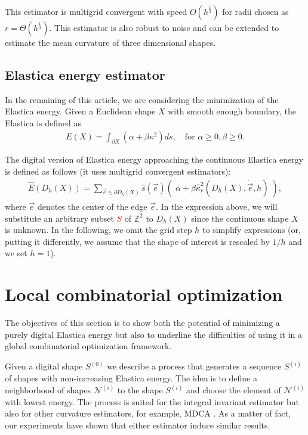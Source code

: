 \documentclass[smallextended]{svjour3}       %
\newcommand{\revision}[1]{\textcolor{red}{#1}}
\begin{document}
This estimator is multigrid convergent with speed $O(h^\frac{1}{3})$
for radii chosen as $r=\Theta(h^\frac{1}{3})$.  This estimator is also
robust to noise and can be extended to estimate the mean curvature of
three dimensional shapes.

\subsection{Elastica energy estimator}

In the remaining of this article, we are considering the minimization of the Elastica energy. Given a Euclidean shape $X$ with smooth enough boundary, the Elastica is defined as
\begin{align}
  E(X) = \int_{\partial X}{(\alpha + \beta \kappa^2) ds}, \quad \text{for~} \alpha \ge 0, \beta \ge 0.
  \label{eq:elastica}
\end{align}

The digital version of Elastica energy approaching the continuous Elastica energy is defined as follows (it uses multigrid convergent estimators):
\begin{align}
	\hat{E}( D_h(X) ) = \sum_{\vec{e} \in \partial D_h(X)}{ \hat{s}(\vec{e})\left(\; \alpha + \beta \hat{\kappa}_{r}^2(D_h(X),\dot{\vec{e}},h) \; \right)},
	\label{eq:digital-energy}
\end{align}
where $\dot{\vec{e}}$ denotes the center of the edge $\vec{e}$. In the
expression above, we will substitute an arbitrary subset \revision{$S$} of
$\mathbb{Z}^2$ to $D_h(X)$ since the continuous shape $X$ is unknown.
In the following, we omit the grid step $h$ to simplify expressions
(or, putting it differently, we assume that the shape of interest is
rescaled by $1/h$ and we set $h=1$).

\section{Local combinatorial optimization}

The objectives of this section is to show both the potential of minimizing a purely digital Elastica energy but also to underline the difficulties of using it in a global combinatorial optimization framework.

Given a digital shape $S^{(0)}$ we describe a process that generates a
sequence $S^{(i)}$ of shapes with non-increasing Elastica energy. The
idea is to define a neighborhood of shapes $\mathcal{N}^{(i)}$ to the
shape $S^{(i)}$ and choose the element of $\mathcal{N}^{(i)}$ with
lowest energy.  The process is suited for the integral invariant
estimator but also for other curvature estimators, for example, MDCA
\cite{roussillon11mdca}. As a matter of fact, our experiments have
shown that either estimator induce similar results.
\end{document}
